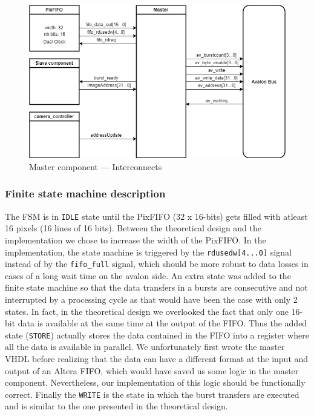 \documentclass{article}
\begin{document}
\begin{figure}[H]
\centering
\includegraphics[scale=0.6]{images/MasterGeneral.png}
\caption{Master component --- Interconnects}
\label{fig:MasterGeneral}
\end{figure}

\subsubsection{Finite state machine description}

The FSM is in \verb'IDLE' state until the PixFIFO (32 x 16-bits) gets filled with atleast 16 pixels (16 lines of 16 bits). Between the theoretical design and the implementation we chose to increase the width of the PixFIFO. In the implementation, the state machine is triggered by the \verb'rdusedw[4...0]' signal instead of by the \verb'fifo_full' signal, which should be more robust to data losses in cases of a long wait time on the avalon side. An extra state was added to the finite state machine so that the data transfers in a bursts are consecutive and not interrupted by a processing cycle as that would have been the case with only 2 states. In fact, in the theoretical design we overlooked the fact that only one 16-bit data is available at the same time at the output of the FIFO. Thus the added state (\verb'STORE') actually stores the data contained in the FIFO into a register where all the data is available in parallel. We unfortunately first wrote the master VHDL before realizing that the data can have a different format at the input and output of an Altera FIFO, which would have saved us some logic in the master component. Nevertheless, our implementation of this logic should be functionally correct. Finally the \verb'WRITE' is the state in which the burst transfers are executed and is similar to the one presented in the theoretical design.
\end{document}
